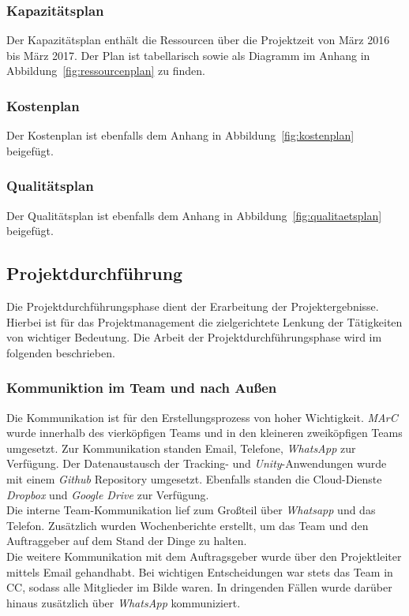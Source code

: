 \subsubsection{Kapazitätsplan}
Der Kapazitätsplan enthält die Ressourcen über die Projektzeit von März 2016 bis März 2017. Der Plan ist tabellarisch sowie als Diagramm im Anhang in Abbildung~\ref{fig:ressourcenplan} zu finden.

\subsubsection{Kostenplan}
Der Kostenplan ist ebenfalls dem Anhang in Abbildung~\ref{fig:kostenplan} beigefügt.

\subsubsection{Qualitätsplan}
Der Qualitätsplan ist ebenfalls dem Anhang in Abbildung~\ref{fig:qualitaetsplan} beigefügt.

\subsection{Projektdurchführung}
Die Projektdurchführungsphase dient der Erarbeitung der Projektergebnisse. Hierbei ist für das Projektmanagement die zielgerichtete Lenkung der Tätigkeiten von wichtiger Bedeutung. Die Arbeit der Projektdurchführungsphase wird im folgenden beschrieben.
\subsubsection{Kommuniktion im Team und nach Außen}
Die Kommunikation ist für den Erstellungsprozess von hoher Wichtigkeit. \textit{MArC} wurde innerhalb des vierköpfigen Teams und in den kleineren zweiköpfigen Teams umgesetzt. Zur Kommunikation standen Email, Telefone, \textit{WhatsApp} zur Verfügung. Der Datenaustausch der Tracking- und \textit{Unity}-Anwendungen wurde mit einem \textit{Github} Repository umgesetzt. Ebenfalls standen die Cloud-Dienste \textit{Dropbox} und \textit{Google Drive} zur Verfügung.\\
Die interne Team-Kommunikation lief zum Großteil über \textit{Whatsapp} und das Telefon. Zusätzlich wurden Wochenberichte erstellt, um das Team und den Auftraggeber auf dem Stand der Dinge zu halten.\\
Die weitere Kommunikation mit dem Auftragsgeber wurde über den Projektleiter mittels Email gehandhabt. Bei wichtigen Entscheidungen war stets das Team in CC, sodass alle Mitglieder im Bilde waren. In dringenden Fällen wurde darüber hinaus zusätzlich über \textit{WhatsApp} kommuniziert.

